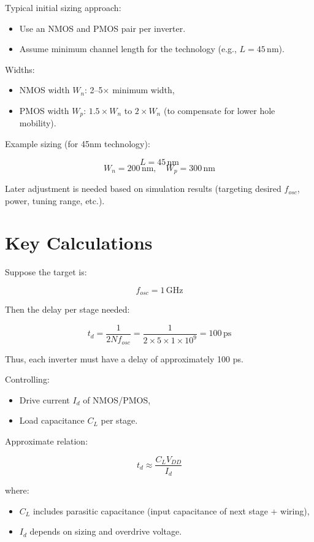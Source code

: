 \begin{itemize}
Typical initial sizing approach:

\begin{itemize}
    \item Use an NMOS and PMOS pair per inverter.
    \item Assume minimum channel length for the technology (e.g., $L = 45\,\mathrm{nm}$).
\end{itemize}

Widths:
\begin{itemize}
    \item NMOS width $W_n$: 2–5$\times$ minimum width,
    \item PMOS width $W_p$: $1.5\times W_n$ to $2\times W_n$ (to compensate for lower hole mobility).
\end{itemize}

Example sizing (for 45nm technology):

\[
L = 45\,\mathrm{nm}
\]
\[
W_n = 200\,\mathrm{nm}, \quad W_p = 300\,\mathrm{nm}
\]

Later adjustment is needed based on simulation results (targeting desired $f_{osc}$, power, tuning range, etc.).

\section{Key Calculations}

Suppose the target is:

\[
f_{osc} = 1\,\mathrm{GHz}
\]

Then the delay per stage needed:

\[
t_d = \frac{1}{2Nf_{osc}} = \frac{1}{2\times5\times1\times10^9} = 100\,\mathrm{ps}
\]

Thus, each inverter must have a delay of approximately 100 ps.

Controlling:

\begin{itemize}
    \item Drive current $I_d$ of NMOS/PMOS,
    \item Load capacitance $C_L$ per stage.
\end{itemize}

Approximate relation:

\[
t_d \approx \frac{C_L V_{DD}}{I_d}
\]

where:
\begin{itemize}
    \item $C_L$ includes parasitic capacitance (input capacitance of next stage + wiring),
    \item $I_d$ depends on sizing and overdrive voltage.
\end{itemize}


\end{itemize}
